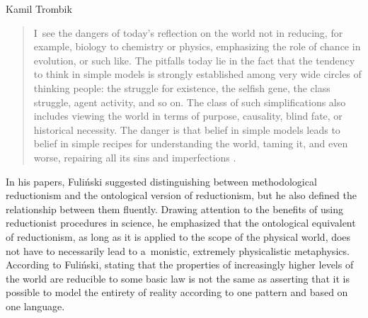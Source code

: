 \begin{artengenv}{Kamil Trombik}
\begin{quote}
I~see the dangers of today's reflection on the world not in reducing, for example, biology to chemistry or physics, emphasizing the role of chance in evolution, or such like. The pitfalls today lie in the fact that the tendency to think in simple models is strongly established among very wide circles of thinking people: the struggle for existence, the selfish gene, the class struggle, agent activity, and so on. The class of such simplifications also includes viewing the world in terms of purpose, causality, blind fate, or historical necessity. The danger is that belief in simple models leads to belief in simple recipes for understanding the world, taming it, and even worse, repairing all its sins and imperfections
\parencite[][p.230]{fulinski_maszyna_1989}.%
\end{quote}




In his papers, Fuliński suggested distinguishing between methodological reductionism and the ontological version of reductionism, but he also defined the relationship between them fluently. Drawing attention to the benefits of using reductionist procedures in science, he emphasized that the ontological equivalent of reductionism, as long as it is applied to the scope of the physical world, does not have to necessarily lead to a~monistic, extremely physicalistic metaphysics. According to Fuliński, stating that the properties of increasingly higher levels of the world are reducible to some basic law is not the same as asserting that it is possible to model the entirety of reality according to one pattern and based on one language.




\end{artengenv}
